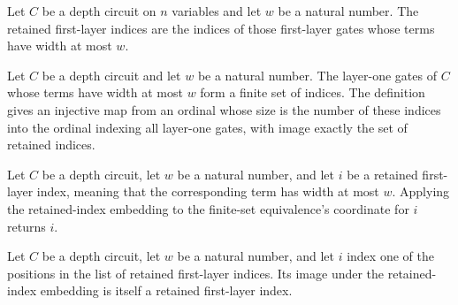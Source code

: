\begin{definition}
\label{FABL.DepthCircuit.retainedLayer1Indices}
\leanok
{}
Let $C$ be a depth circuit on $n$ variables and let $w$ be a natural number. The
retained first-layer indices are the indices of those first-layer gates whose terms have
width at most $w$.
\end{definition}

\begin{definition}
\label{FABL.DepthCircuit.retainedLayer1Embedding}
\leanok
{}
Let $C$ be a depth circuit and let $w$ be a natural number. The layer-one gates of $C$
whose terms have width at most $w$ form a finite set of indices. The definition gives an
injective map from an ordinal whose size is the number of these indices into the ordinal
indexing all layer-one gates, with image exactly the set of retained indices.
\end{definition}

\begin{theorem}
\label{FABL.DepthCircuit.retainedLayer1Embedding_equivFin}
\leanok
{}
Let $C$ be a depth circuit, let $w$ be a natural number, and let $i$ be a retained
first-layer index, meaning that the corresponding term has width at most $w$. Applying
the retained-index embedding to the finite-set equivalence's coordinate for $i$ returns
$i$.
\end{theorem}

\begin{theorem}
\label{FABL.DepthCircuit.retainedLayer1Embedding_mem}
\leanok
{}
Let $C$ be a depth circuit, let $w$ be a natural number, and let $i$ index one of the
positions in the list of retained first-layer indices. Its image under the
retained-index embedding is itself a retained first-layer index.
\end{theorem}


